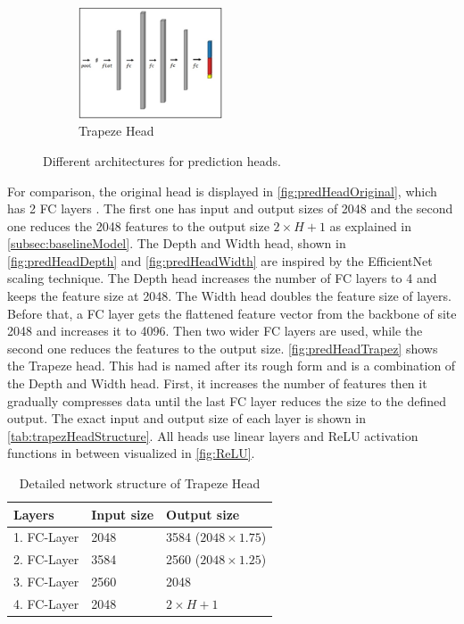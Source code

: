 \begin{figure}[H]
\begin{subfigure}[t]{0.26\textwidth}
        \centering
        \includegraphics[height=3.3cm, keepaspectratio]{PICs/improvedModel/trapezHead.jpg}
        \caption{Trapeze Head}
        \label{fig:predHeadTrapez}
    \end{subfigure}
    \caption{Different architectures for prediction heads.}
    \label{fig:differentpredHeads}
\end{figure}

For comparison, the original head is displayed in \autoref{fig:predHeadOriginal}, which has 2 \ac{FC} layers \cite{pytorch_linearLayer_docu}.
The first one has input and output sizes of 2048 and the second one reduces the 2048 features to the output size $2 \times H + 1$ as explained in \autoref{subsec:baselineModel}.
The Depth and Width head, shown in \autoref{fig:predHeadDepth} and \autoref{fig:predHeadWidth} are inspired by the EfficientNet \cite{EfficientNet} scaling technique.
The Depth head increases the number of \ac{FC} layers to 4 and keeps the feature size at 2048.
The Width head doubles the feature size of layers.
Before that, a \ac{FC} layer gets the flattened feature vector from the backbone of site 2048 and increases it to 4096.
Then two wider \ac{FC} layers are used, while the second one reduces the features to the output size.
\autoref{fig:predHeadTrapez} shows the Trapeze head.
This had is named after its rough form and is a combination of the Depth and Width head.
First, it increases the number of features then it gradually compresses data until the last \ac{FC} layer reduces the size to the defined output.
The exact input and output size of each layer is shown in \autoref{tab:trapezHeadStructure}.
All heads use linear layers \cite{pytorch_linearLayer_docu} and \ac{ReLU} activation functions \cite{pytorch_relu_docu} in between visualized in \autoref{fig:ReLU}.

\begin{table}[H]
    \centering
    \begin{tabular}{|l|l|l|}
        \hline
        \textbf{Layers} & \textbf{Input size} & \textbf{Output size}\\
        \hline
        1. FC-Layer & 2048 & 3584 ($2048 \times 1.75$)\\
        \hline
        2. FC-Layer & 3584 & 2560 ($2048 \times 1.25$)\\
        \hline
        3. FC-Layer & 2560 & 2048\\
        \hline
        4. FC-Layer & 2048 & \(2 \times H + 1\)\\
        \hline
    \end{tabular}
    \caption{Detailed network structure of Trapeze Head}
    \label{tab:trapezHeadStructure}
\end{table}

